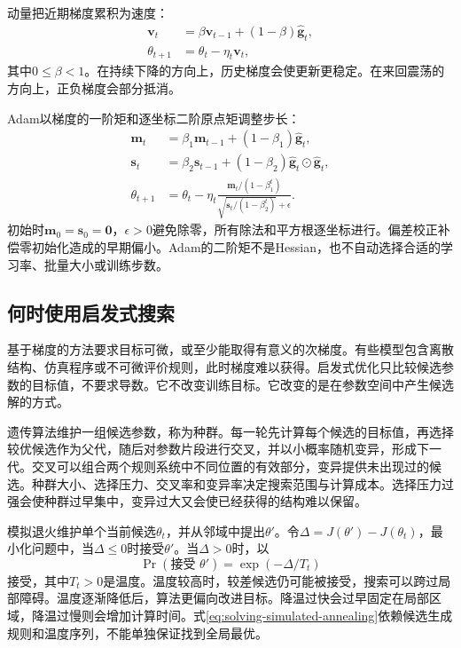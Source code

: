 动量把近期梯度累积为速度：
\begin{align}
 \bm v_t&=\beta\bm v_{t-1}+(1-\beta)\hat{\bm g}_t,\\
 \theta_{t+1}&=\theta_t-\eta_t\bm v_t,
\end{align}
其中$0\leq\beta<1$。在持续下降的方向上，历史梯度会使更新更稳定。在来回震荡的方向上，正负梯度会部分抵消。

Adam以梯度的一阶矩和逐坐标二阶原点矩调整步长\cite{kingma2015adam}：
\begin{align}
 \bm m_t&=\beta_1\bm m_{t-1}+(1-\beta_1)\hat{\bm g}_t,\\
 \bm s_t&=\beta_2\bm s_{t-1}+(1-\beta_2)\hat{\bm g}_t\odot\hat{\bm g}_t,\\
 \theta_{t+1}&=\theta_t-\eta_t\frac{\bm m_t/(1-\beta_1^t)}{\sqrt{\bm s_t/(1-\beta_2^t)}+\epsilon}.
 \label{eq:solving-adam}
\end{align}
初始时$\bm m_0=\bm s_0=\bm0$，$\epsilon>0$避免除零，所有除法和平方根逐坐标进行。偏差校正补偿零初始化造成的早期偏小。Adam的二阶矩不是Hessian，也不自动选择合适的学习率、批量大小或训练步数。

\subsection{何时使用启发式搜索}
基于梯度的方法要求目标可微，或至少能取得有意义的次梯度。有些模型包含离散结构、仿真程序或不可微评价规则，此时梯度难以获得。启发式优化只比较候选参数的目标值，不要求导数。它不改变训练目标。它改变的是在参数空间中产生候选解的方式。

遗传算法维护一组候选参数，称为种群。每一轮先计算每个候选的目标值，再选择较优候选作为父代，随后对参数片段进行交叉，并以小概率随机变异，形成下一代。交叉可以组合两个规则系统中不同位置的有效部分，变异提供未出现过的候选。种群大小、选择压力、交叉率和变异率决定搜索范围与计算成本。选择压力过强会使种群过早集中，变异过大又会使已经获得的结构难以保留。

模拟退火维护单个当前候选$\theta_t$，并从邻域中提出$\theta'$。令$\Delta=J(\theta')-J(\theta_t)$，最小化问题中，当$\Delta\leq0$时接受$\theta'$。当$\Delta>0$时，以
\begin{equation}
 \Pr(\text{接受 }\theta')=\exp(-\Delta/T_t)
 \label{eq:solving-simulated-annealing}
\end{equation}
接受，其中$T_t>0$是温度。温度较高时，较差候选仍可能被接受，搜索可以跨过局部障碍。温度逐渐降低后，算法更偏向改进目标。降温过快会过早固定在局部区域，降温过慢则会增加计算时间。式\eqref{eq:solving-simulated-annealing}依赖候选生成规则和温度序列，不能单独保证找到全局最优。

